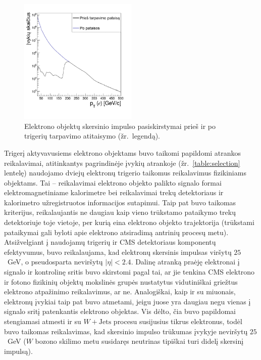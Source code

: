\documentclass[a4paper, 12pt, oneside]{article}
\newcommand{\WJets}{W\! +\!\mathrm{Jets}}
\begin{document}
\begin{figure}[t!]
	\includegraphics[width=0.5\textwidth]{Magistrinis/prescale.png}
	\vspace{-1.2cm}
	\caption{\label{fig:prescale} Elektrono objektų skersinio impulso pasiskirstymai prieš ir po trigerių tarpavimo
	atitaisymo (žr.\ legendą).}
\end{figure}

Trigerį aktyvavusiems elektrono objektams buvo taikomi papildomi atrankos reikalavimai, atitinkantys pagrindinėje įvykių
atrankoje (žr.\ \ref{table:selection} lentelę) naudojamo dviejų elektronų trigerio taikomus reikalavimus fizikiniams objektams.
Tai -- reikalavimai elektrono objekto palikto signalo formai elektromagnetiniame kalorimetre bei reikalavimai
trekų detektoriaus ir kalorimetro užregistruotos informacijos sutapimui.
Taip pat buvo taikomas kriterijus, reikalaujantis ne daugiau kaip vieno trūkstamo pataikymo trekų detektoriuje toje vietoje, per
kurią eina elektrono objekto trajektorija (trūkstami pataikymai gali byloti apie elektrono atsiradimą antrinių procesų metu).
Atsižvelgiant į naudojamų trigerių ir CMS detektoriaus komponentų efektyvumus, buvo reikalaujama, kad elektronų skersinis
impulsas viršytų $25$~GeV, o pseudosparta neviršytų $|\eta|<2.4$.
Dalinę atranką praėję elektronai į signalo ir kontrolinę sritis buvo skirstomi pagal tai, ar jie tenkina CMS elektrono
ir fotono fizikinių objektų mokslinės grupės nustatytus vidutiniškai griežtus elektrono atpažinimo reikalavimus, ar ne.
Analogiškai, kaip ir su miuonais, elektronų įvykiai taip pat buvo atmetami, jeigu juose yra daugiau negu vienas į signalo
sritį patenkantis elektrono objektas.
Vis dėlto, čia buvo papildomai stengiamasi atmesti ir su $\WJets$ procesu susijusius tikrus elektronus, todėl buvo taikomas
reikalavimas, kad skersinio impulso trūkumas įvykyje neviršytų $25$~GeV ($W$ bozono skilimo metu susidaręs neutrinas tipiškai
turi didelį skersinį impulsą).
\end{document}

